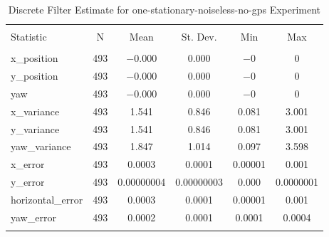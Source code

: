 
\begin{table}[h] \centering 
  \caption{Discrete Filter Estimate for one-stationary-noiseless-no-gps Experiment} 
  \label{tab:one_stationary_noiseless_no_gps_discrete_summary} 
\begin{tabular}{@{\extracolsep{5pt}}lccccc} 
\\[-1.8ex]\hline 
\hline \\[-1.8ex] 
Statistic & \multicolumn{1}{c}{N} & \multicolumn{1}{c}{Mean} & \multicolumn{1}{c}{St. Dev.} & \multicolumn{1}{c}{Min} & \multicolumn{1}{c}{Max} \\ 
\hline \\[-1.8ex] 
x\_position & 493 & $-$0.000 & 0.000 & $-$0 & 0 \\ 
y\_position & 493 & $-$0.000 & 0.000 & $-$0 & 0 \\ 
yaw & 493 & $-$0.000 & 0.000 & $-$0 & 0 \\ 
x\_variance & 493 & 1.541 & 0.846 & 0.081 & 3.001 \\ 
y\_variance & 493 & 1.541 & 0.846 & 0.081 & 3.001 \\ 
yaw\_variance & 493 & 1.847 & 1.014 & 0.097 & 3.598 \\ 
x\_error & 493 & 0.0003 & 0.0001 & 0.00001 & 0.001 \\ 
y\_error & 493 & 0.00000004 & 0.00000003 & 0.000 & 0.0000001 \\ 
horizontal\_error & 493 & 0.0003 & 0.0001 & 0.00001 & 0.001 \\ 
yaw\_error & 493 & 0.0002 & 0.0001 & 0.0001 & 0.0004 \\ 
\hline \\[-1.8ex] 
\end{tabular} 
\end{table} 
